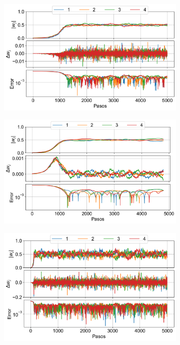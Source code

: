\documentclass[aps,prb,twocolumn,superscriptaddress,floatfix,longbibliography]{revtex4-2}
\begin{document}
\begin{figure}
  \centering
  \begin{subfigure}[b]{0.3\textwidth}
      \centering
      \includegraphics[width=\textwidth]{ej1_fig1.png}
      \caption{\label{fig:ej1_fig1}}
  \end{subfigure}
  \hfill
  \begin{subfigure}[b]{0.3\textwidth}
      \centering
      \includegraphics[width=\textwidth]{ej1_fig2.png}
      \caption{\label{fig:ej1_fig2}}
  \end{subfigure}
  \hfill
  \begin{subfigure}[b]{0.3\textwidth}
      \centering
      \includegraphics[width=\textwidth]{ej1_fig3.png}

\end{subfigure}
\end{figure}
\end{document}
